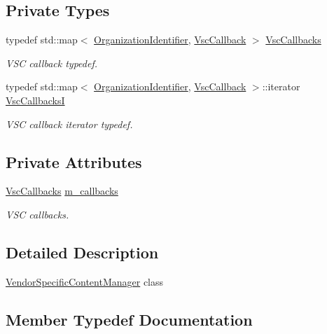 \subsection*{Private Types}
\begin{DoxyCompactItemize}
\item 
typedef std\+::map$<$ \hyperlink{classns3_1_1OrganizationIdentifier}{Organization\+Identifier}, \hyperlink{namespacens3_acd51abe7aaf87942dfd56b0e5e1f899f}{Vsc\+Callback} $>$ \hyperlink{classns3_1_1VendorSpecificContentManager_a2f81de58403479efccbc4df28a025951}{Vsc\+Callbacks}
\begin{DoxyCompactList}\small\item\em V\+SC callback typedef. \end{DoxyCompactList}\item 
typedef std\+::map$<$ \hyperlink{classns3_1_1OrganizationIdentifier}{Organization\+Identifier}, \hyperlink{namespacens3_acd51abe7aaf87942dfd56b0e5e1f899f}{Vsc\+Callback} $>$\+::iterator \hyperlink{classns3_1_1VendorSpecificContentManager_ab78cc997dd47e69e0a0619b8075fbefd}{Vsc\+CallbacksI}
\begin{DoxyCompactList}\small\item\em V\+SC callback iterator typedef. \end{DoxyCompactList}\end{DoxyCompactItemize}
\subsection*{Private Attributes}
\begin{DoxyCompactItemize}
\item 
\hyperlink{classns3_1_1VendorSpecificContentManager_a2f81de58403479efccbc4df28a025951}{Vsc\+Callbacks} \hyperlink{classns3_1_1VendorSpecificContentManager_ad0158e9d57b8021024fdb08a928cc13b}{m\+\_\+callbacks}
\begin{DoxyCompactList}\small\item\em V\+SC callbacks. \end{DoxyCompactList}\end{DoxyCompactItemize}


\subsection{Detailed Description}
\hyperlink{classns3_1_1VendorSpecificContentManager}{Vendor\+Specific\+Content\+Manager} class 

\subsection{Member Typedef Documentation}
